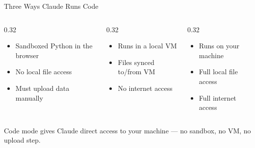 \documentclass[aspectratio=169]{beamer}
\begin{document}
\begin{frame}{Three Ways Claude Runs Code}
\begin{columns}[T]
\begin{column}{0.32\textwidth}
\begin{shadedbox}[title=\textbf{Chat (Analysis)}]
\begin{itemize}\footnotesize
  \item Sandboxed Python in the browser
  \item No local file access
  \item Must upload data manually
\end{itemize}
\end{shadedbox}
\end{column}
\begin{column}{0.32\textwidth}
\begin{shadedbox}[title=\textbf{Cowork}]
\begin{itemize}\footnotesize
  \item Runs in a local VM
  \item Files synced to/from VM
  \item \alert{No internet access}
\end{itemize}
\end{shadedbox}
\end{column}
\begin{column}{0.32\textwidth}
\begin{shadedbox}[title=\textbf{Code}]
\begin{itemize}\footnotesize
  \item Runs on \alert{your machine}
  \item Full local file access
  \item Full internet access
\end{itemize}
\end{shadedbox}
\end{column}
\end{columns}
\vspace{0.3cm}
\begin{center}
\alert{Code mode} gives Claude direct access to your machine --- no sandbox, no VM, no upload step.
\end{center}
\end{frame}
\end{document}
